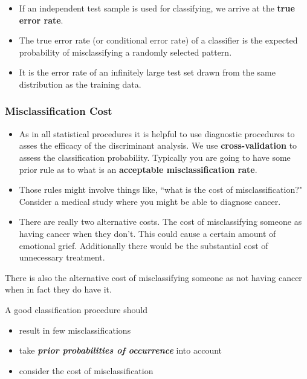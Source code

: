 \documentclass[PredictiveAnalytics101.tex]{subfiles}
\begin{document}
\begin{frame}
\begin{itemize}
\item If an independent test sample is used for classifying, we arrive at the  \textbf{true error rate}.
\item The true error rate (or conditional error rate) of a classifier is the expected
probability of misclassifying a randomly selected pattern.
\item It is the error rate of an infinitely large test set drawn from the same distribution as the training data.
\end{itemize}


\end{frame}
\begin{frame}
\frametitle{Misclassification Cost}
\begin{itemize}
\item As in all statistical procedures it is helpful to use diagnostic procedures to asses the efficacy of the discriminant analysis. We use \textbf{cross-validation} to assess the classification probability.
Typically you are going to have some prior rule as to what is an \textbf{acceptable misclassification rate}.

\item Those rules might involve things like, ``what is the cost of misclassification?" Consider a medical study where you might be able to diagnose cancer.

\item There are really two alternative costs. The cost of misclassifying someone as having cancer when they don't.
This could cause a certain amount of emotional grief. Additionally there would be the substantial cost of unnecessary treatment.
\end{itemize}


\end{frame}
\begin{frame}
There is also the alternative cost of misclassifying someone as not having cancer when in fact they do have it.

A good classification procedure should
 \begin{itemize}
 \item result in few misclassifications
 \item take \textbf{\textit{prior probabilities of occurrence}} into account
 \item consider the cost of misclassification
 \end{itemize}
 \end{frame}
\end{document}
